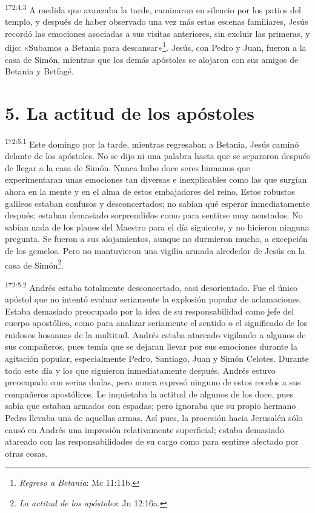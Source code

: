 \par
\textsuperscript{172:4.3} A medida que avanzaba la tarde, caminaron en silencio por los patios del templo, y después de haber observado una vez más estas escenas familiares, Jesús recordó las emociones asociadas a sus visitas anteriores, sin excluir las primeras, y dijo: «Subamos a Betania para descansar»\footnote{\textit{Regreso a Betania}: Mc 11:11b.}. Jesús, con Pedro y Juan, fueron a la casa de Simón, mientras que los demás apóstoles se alojaron con sus amigos de Betania y Betfagé.

\section*{5. La actitud de los apóstoles}
\par
\textsuperscript{172:5.1} Este domingo por la tarde, mientras regresaban a Betania, Jesús caminó delante de los apóstoles. No se dijo ni una palabra hasta que se separaron después de llegar a la casa de Simón. Nunca hubo doce seres humanos que experimentaran unas emociones tan diversas e inexplicables como las que surgían ahora en la mente y en el alma de estos embajadores del reino. Estos robustos galileos estaban confusos y desconcertados; no sabían qué esperar inmediatamente después; estaban demasiado sorprendidos como para sentirse muy asustados. No sabían nada de los planes del Maestro para el día siguiente, y no hicieron ninguna pregunta. Se fueron a sus alojamientos, aunque no durmieron mucho, a excepción de los gemelos. Pero no mantuvieron una vigilia armada alrededor de Jesús en la casa de Simón\footnote{\textit{La actitud de los apóstoles}: Jn 12:16a.}.

\par
\textsuperscript{172:5.2} Andrés estaba totalmente desconcertado, casi desorientado. Fue el único apóstol que no intentó evaluar seriamente la explosión popular de aclamaciones. Estaba demasiado preocupado por la idea de su responsabilidad como jefe del cuerpo apostólico, como para analizar seriamente el sentido o el significado de los ruidosos hosannas de la multitud. Andrés estaba atareado vigilando a algunos de sus compañeros, pues temía que se dejaran llevar por sus emociones durante la agitación popular, especialmente Pedro, Santiago, Juan y Simón Celotes. Durante todo este día y los que siguieron inmediatamente después, Andrés estuvo preocupado con serias dudas, pero nunca expresó ninguno de estos recelos a sus compañeros apostólicos. Le inquietaba la actitud de algunos de los doce, pues sabía que estaban armados con espadas; pero ignoraba que su propio hermano Pedro llevaba una de aquellas armas. Así pues, la procesión hacia Jerusalén sólo causó en Andrés una impresión relativamente superficial; estaba demasiado atareado con las responsabilidades de su cargo como para sentirse afectado por otras cosas.

